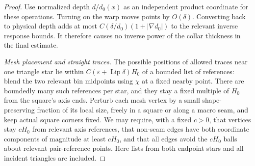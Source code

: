 \documentclass[11pt]{article}
\numberwithin{equation}{section}
\theoremstyle{definition}
\theoremstyle{remark}
\begin{document}
\begin{proof}
Use normalized depth $d/d_0(x)$ as an independent product coordinate
for these operations.  Turning on the warp moves points by $O(\delta)$.
Converting back to physical depth adds at most
$C(\delta/d_0)(1+|\nabla d_0|)$ to the relevant inverse response
bounds.  It therefore causes no inverse power of the collar thickness
in the final estimate.

\emph{Mesh placement and straight traces.}
The possible positions of allowed traces near one triangle star lie
within $C(\varepsilon+\operatorname{Lip}\delta)H_0$ of a bounded list of
references: blend the two relevant bin midpoints using $\chi$ at a
fixed nearby point.  There are boundedly many such references per
star, and they stay a fixed multiple of $H_0$ from the square's axis
ends.  Perturb each mesh vertex by a small shape-preserving fraction
of its local size, freely in a square or along a macro seam, and keep
actual square corners fixed.  We may require, with a fixed $c>0$,
that vertices stay $cH_0$ from relevant axis references, that
non-seam edges have both coordinate components of magnitude at
least $cH_0$, and that all edges avoid the $cH_0$ balls about relevant
pair-reference points.  Here lists from both endpoint stars and all
incident triangles are included.


\end{proof}
\end{document}
